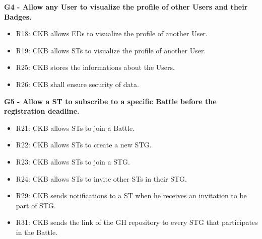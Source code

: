 \vspace{1.5cm}
\textbf{G4 - Allow any User to visualize the profile of other Users and their Badges.}\\
\begin{itemize}
    \item R18: CKB allows EDs to visualize the profile of another User.
    \item R19: CKB allows STs to visualize the profile of another User.
    \item R25: CKB stores the informations about the Users.
    \item R26: CKB shall ensure security of data. 
\end{itemize}


\vspace{1.5cm}
\textbf{G5 - Allow a ST to subscribe to a specific Battle before the registration deadline.}\\
\begin{itemize}
    \item R21: CKB allows STs to join a Battle.
    \item R22: CKB allows STs to create a new STG.
    \item R23: CKB allows STs to join a STG.
    \item R24: CKB allows STs to invite other STs in their STG.
    \item R29: CKB sends notifications to a ST when he receives an invitation to be part of STG.
    \item R31: CKB sends the link of the GH repository to every STG that participates in the Battle.
\end{itemize}


